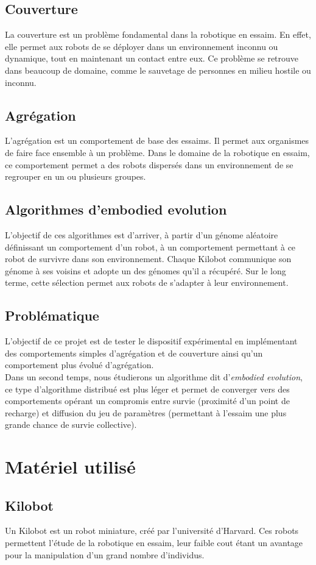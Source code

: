 \documentclass[a4paper]{article}
\begin{document}
\subsection{Couverture}
La couverture est un problème fondamental dans la robotique en essaim. En effet, elle permet aux robots de se déployer dans un environnement inconnu ou dynamique, tout en maintenant un contact entre eux. Ce problème se retrouve dans beaucoup de domaine, comme le sauvetage de personnes en milieu hostile ou inconnu.
\subsection{Agrégation}
L'agrégation est un comportement de base des essaims. Il permet aux organismes de faire face ensemble à un problème. Dans le domaine de la robotique en essaim, ce comportement permet a des robots dispersés dans un environnement de se regrouper en un ou plusieurs groupes.
\subsection{Algorithmes d'embodied evolution}
L'objectif de ces algorithmes est d'arriver, à partir d'un génome aléatoire définissant un comportement d'un robot, à un comportement permettant à ce robot de survivre dans son environnement. Chaque Kilobot communique son génome à ses voisins et adopte un des génomes qu'il a récupéré. Sur le long terme, cette sélection permet aux robots de s'adapter à leur environnement.
\subsection{Problématique}
L'objectif de ce projet est de tester le dispositif expérimental en implémentant des comportements simples d'agrégation et de couverture ainsi qu'un comportement plus évolué d'agrégation. \\Dans un second temps, nous étudierons un algorithme dit d'\textit{embodied evolution}, ce type d'algorithme distribué est plus léger et permet de converger vers des comportements opérant un compromis entre survie (proximité d'un point de recharge) et diffusion du jeu de paramètres (permettant à l'essaim une plus grande chance de survie collective).
\newpage
\section{Matériel utilisé}
\subsection{Kilobot}
Un Kilobot \cite{rubenstein_kilobot:_2012} est un robot miniature, créé par l'université d'Harvard. Ces robots permettent l'étude de la robotique en essaim, leur faible cout étant un avantage pour la manipulation d'un grand nombre d'individus.
\end{document}
